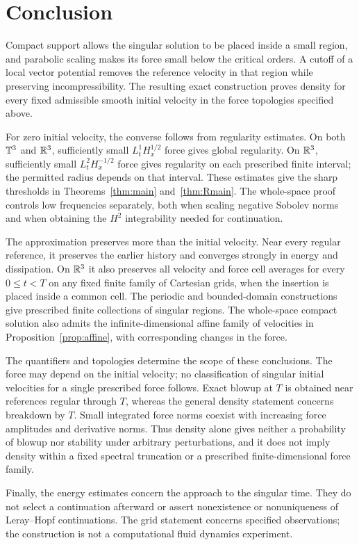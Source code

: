\section{Conclusion}\label{sec:discussion}
Compact support allows the singular solution to be placed inside a small
region, and parabolic scaling makes its force small below the critical
orders. A cutoff of a local vector potential removes the reference velocity
in that region while preserving incompressibility. The resulting exact
construction proves density for every fixed admissible smooth initial
velocity in the force topologies specified above.

For zero initial velocity, the converse follows from regularity estimates.
On both $\mathbb T^3$ and $\mathbb R^3$, sufficiently small $L^1_tH^{1/2}_x$ force gives
global regularity. On $\mathbb R^3$, sufficiently small $L^2_tH^{-1/2}_x$ force
gives regularity on each prescribed finite interval; the permitted radius
depends on that interval. These estimates give the sharp thresholds in
Theorems~\ref{thm:main} and~\ref{thm:Rmain}. The whole-space proof controls
low frequencies separately, both when scaling negative Sobolev norms and
when obtaining the $H^2$ integrability needed for continuation.

The approximation preserves more than the initial velocity. Near every
regular reference, it preserves the earlier history and converges strongly
in energy and dissipation. On $\mathbb R^3$ it also preserves all velocity and
force cell averages for every $0\le t<T$ on any fixed finite family of
Cartesian grids, when the insertion is placed inside a common cell.
The periodic and bounded-domain constructions give prescribed finite
collections of singular regions. The whole-space compact solution also
admits the infinite-dimensional affine family of velocities in
Proposition~\ref{prop:affine}, with corresponding changes in the force.

The quantifiers and topologies determine the scope of these conclusions.
The force may depend on the initial velocity; no classification of singular
initial velocities for a single prescribed force follows. Exact blowup at
$T$ is obtained near references regular through $T$, whereas the general
density statement concerns breakdown by $T$. Small integrated force norms
coexist with increasing force amplitudes and derivative norms. Thus density
alone gives neither a probability of blowup nor stability under arbitrary
perturbations, and it does not imply density within a fixed spectral
truncation or a prescribed finite-dimensional force family.

Finally, the energy estimates concern the approach to the singular time.
They do not select a continuation afterward or assert nonexistence or
nonuniqueness of Leray--Hopf continuations. The grid statement concerns
specified observations; the construction is not a computational fluid
dynamics experiment.
